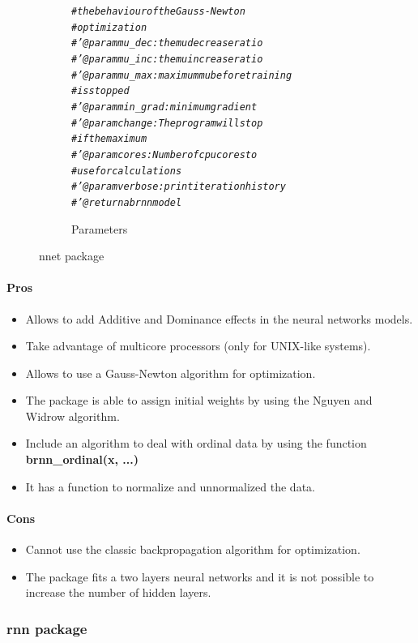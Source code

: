 \documentclass[letter,8pt]{article}\usepackage[]{graphicx}\usepackage[]{color}
\makeatletter
\newcommand{\hlcom}[1]{\textcolor[rgb]{0.678,0.584,0.686}{\textit{#1}}}%
\newenvironment{kframe}{%
 \def\at@end@of@kframe{}%
 \ifinner\ifhmode%
  \def\at@end@of@kframe{\end{minipage}}%
  \begin{minipage}{\columnwidth}%
 \fi\fi%
 \def\FrameCommand##1{\hskip\@totalleftmargin \hskip-\fboxsep
 \colorbox{shadecolor}{##1}\hskip-\fboxsep
     \hskip-\linewidth \hskip-\@totalleftmargin \hskip\columnwidth}%
 \MakeFramed {\advance\hsize-\width
   \@totalleftmargin\z@ \linewidth\hsize
   \@setminipage}}%
 {\par\unskip\endMakeFramed%
 \at@end@of@kframe}
\newenvironment{knitrout}{}{} %
\makeatother
\begin{document}
\begin{figure}[H]
\begin{subfigure}{0.5\textwidth}
\begin{knitrout}
\begin{kframe}
\begin{alltt}
\hlcom{#         the behaviour of the Gauss-Newton}
\hlcom{#         optimization}
\hlcom{#' @param mu_dec : the mu decrease ratio}
\hlcom{#' @param mu_inc : the mu increase ratio}
\hlcom{#' @param mu_max : maximum mu before training }
\hlcom{#         is stopped}
\hlcom{#' @param min_grad : minimum gradient}
\hlcom{#' @param change : The program will stop}
\hlcom{#         if the maximum}
\hlcom{#' @param cores : Number of cpu cores to}
\hlcom{#         use for calculations}
\hlcom{#' @param verbose : print iteration history}
\hlcom{#' @return a brnn model}
\end{alltt}
\end{kframe}
\end{knitrout}
    \caption{Parameters}
  \end{subfigure}
    \caption{nnet package}
\end{figure}


\paragraph{Pros}
\begin{itemize}
\item Allows to add Additive and Dominance effects in the neural networks models.
\item Take advantage of multicore processors (only for UNIX-like systems).
\item Allows to use a Gauss-Newton algorithm for optimization.
\item The package is able to assign initial weights by using the Nguyen and Widrow algorithm.
\item Include an algorithm to deal with ordinal data by using the function \textbf{brnn\_ordinal(x, ...)}
\item It has a function to normalize and unnormalized the data.
\end{itemize}
\paragraph{Cons}
\begin{itemize}
\item Cannot use the classic backpropagation algorithm for optimization.
\item The package fits a two layers neural networks and it is not possible to increase the number of hidden layers.
\end{itemize}

\subsubsection{rnn package}
\end{document}
